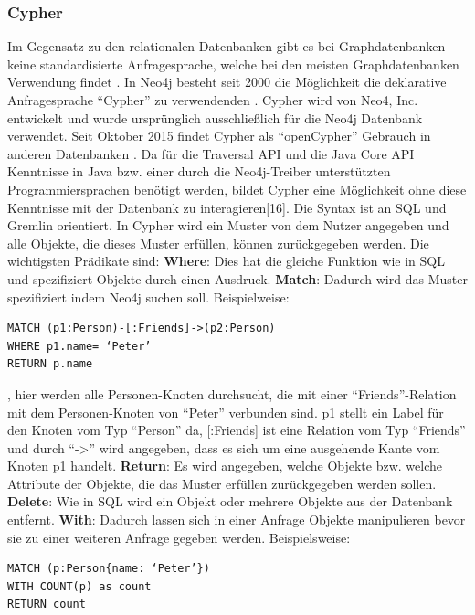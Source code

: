\subsubsection{Cypher}
Im Gegensatz zu den relationalen Datenbanken gibt es bei Graphdatenbanken keine standardisierte Anfragesprache, welche bei den meisten Graphdatenbanken Verwendung findet \parencite{han2011survey}. In Neo4j besteht seit 2000 die Möglichkeit die deklarative Anfragesprache “Cypher” zu verwendenden  \parencite{francis2018cypher}. Cypher wird von Neo4, Inc. entwickelt und wurde ursprünglich ausschließlich für die Neo4j Datenbank verwendet. Seit Oktober 2015  findet Cypher als “openCypher” Gebrauch in anderen Datenbanken \parencite{francis2018cypher}. Da für die Traversal API und die Java Core API Kenntnisse in Java bzw. einer durch die Neo4j-Treiber unterstützten Programmiersprachen benötigt werden, bildet Cypher eine Möglichkeit ohne diese Kenntnisse mit der Datenbank zu interagieren[16]. Die Syntax ist an SQL und Gremlin \parencite{vukotic2015neo4j} orientiert. In Cypher wird ein Muster von dem Nutzer angegeben und alle Objekte, die dieses Muster erfüllen, können zurückgegeben werden. Die wichtigsten  Prädikate sind: \newline
\textbf{Where}: Dies hat die gleiche Funktion wie in SQL und spezifiziert Objekte durch einen Ausdruck. \newline
\textbf{Match}: Dadurch wird das Muster spezifiziert indem Neo4j suchen soll. Beispielweise: 
\begin{Verbatim}[frame=single]
MATCH (p1:Person)-[:Friends]->(p2:Person) 
WHERE p1.name= ‘Peter’ 
RETURN p.name
\end{Verbatim}
, hier werden alle Personen-Knoten durchsucht, die mit einer “Friends”-Relation mit dem Personen-Knoten von “Peter” verbunden sind. p1 stellt ein Label für den Knoten vom Typ “Person” da, [:Friends] ist eine Relation vom Typ “Friends” und durch “->” wird angegeben, dass es sich um eine ausgehende Kante vom Knoten p1 handelt. \newline
\textbf{Return}: Es wird angegeben, welche Objekte bzw. welche Attribute der Objekte, die das Muster erfüllen zurückgegeben werden sollen.\newline
\textbf{Delete}: Wie in SQL  wird ein Objekt  oder mehrere Objekte aus der Datenbank entfernt.\newline
\textbf{With}: Dadurch lassen sich in einer Anfrage Objekte manipulieren bevor sie zu einer weiteren Anfrage gegeben werden. Beispielsweise:
\begin{Verbatim}[frame=single]
MATCH (p:Person{name: ‘Peter’})  
WITH COUNT(p) as count  
RETURN count
\end{Verbatim} 
